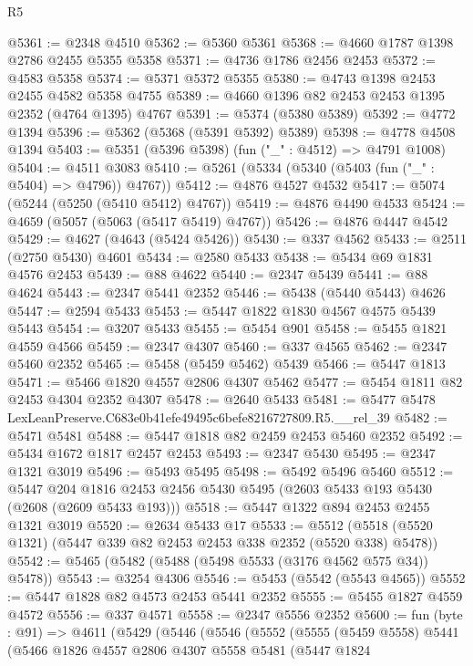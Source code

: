 \begin{lexlean}{R5}
\begin{coremodule}
@5361 := @2348 @4510
@5362 := @5360 @5361
@5368 := @4660 @1787 @1398 @2786 @2455 @5355 @5358
@5371 := @4736 @1786 @2456 @2453
@5372 := @4583 @5358
@5374 := @5371 @5372 @5355
@5380 := @4743 @1398 @2453 @2455 @4582 @5358 @4755
@5389 := @4660 @1396 @82 @2453 @2453 @1395 @2352 (@4764 @1395) @4767
@5391 := @5374 (@5380 @5389)
@5392 := @4772 @1394
@5396 := @5362 (@5368 (@5391 @5392) @5389)
@5398 := @4778 @4508 @1394
@5403 := @5351 (@5396 @5398) (fun ("_" : @4512) => @4791 @1008)
@5404 := @4511 @3083
@5410 := @5261 (@5334 (@5340 (@5403 (fun ("_" : @5404) => @4796)) @4767))
@5412 := @4876 @4527 @4532
@5417 := @5074 (@5244 (@5250 (@5410 @5412) @4767))
@5419 := @4876 @4490 @4533
@5424 := @4659 (@5057 (@5063 (@5417 @5419) @4767))
@5426 := @4876 @4447 @4542
@5429 := @4627 (@4643 (@5424 @5426))
@5430 := @337 @4562
@5433 := @2511 (@2750 @5430) @4601
@5434 := @2580 @5433
@5438 := @5434 @69 @1831 @4576 @2453
@5439 := @88 @4622
@5440 := @2347 @5439
@5441 := @88 @4624
@5443 := @2347 @5441 @2352
@5446 := @5438 (@5440 @5443) @4626
@5447 := @2594 @5433
@5453 := @5447 @1822 @1830 @4567 @4575 @5439 @5443
@5454 := @3207 @5433
@5455 := @5454 @901
@5458 := @5455 @1821 @4559 @4566
@5459 := @2347 @4307
@5460 := @337 @4565
@5462 := @2347 @5460 @2352
@5465 := @5458 (@5459 @5462) @5439
@5466 := @5447 @1813
@5471 := @5466 @1820 @4557 @2806 @4307 @5462
@5477 := @5454 @1811 @82 @2453 @4304 @2352 @4307
@5478 := @2640 @5433
@5481 := @5477 @5478 LexLeanPreserve.C683e0b41efe49495c6befe8216727809.R5.__rel_39
@5482 := @5471 @5481
@5488 := @5447 @1818 @82 @2459 @2453 @5460 @2352
@5492 := @5434 @1672 @1817 @2457 @2453
@5493 := @2347 @5430
@5495 := @2347 @1321 @3019
@5496 := @5493 @5495
@5498 := @5492 @5496 @5460
@5512 := @5447
    @204
    @1816
    @2453
    @2456
    @5430
    @5495
    (@2603 @5433 @193 @5430 (@2608 (@2609 @5433 @193)))
@5518 := @5447 @1322 @894 @2453 @2455 @1321 @3019
@5520 := @2634 @5433 @17
@5533 := @5512 (@5518 (@5520 @1321) (@5447 @339 @82 @2453 @2453 @338 @2352 (@5520 @338) @5478))
@5542 := @5465 (@5482 (@5488 (@5498 @5533 (@3176 @4562 @575 @34)) @5478))
@5543 := @3254 @4306
@5546 := @5453 (@5542 (@5543 @4565))
@5552 := @5447 @1828 @82 @4573 @2453 @5441 @2352
@5555 := @5455 @1827 @4559 @4572
@5556 := @337 @4571
@5558 := @2347 @5556 @2352
@5600 := fun (byte : @91) =>
  @4611
    (@5429
      (@5446
        (@5546
          (@5552
            (@5555
              (@5459 @5558)
              @5441
              (@5466
                @1826
                @4557
                @2806
                @4307
                @5558
                @5481
                (@5447
                  @1824

\end{coremodule}
\end{lexlean}
